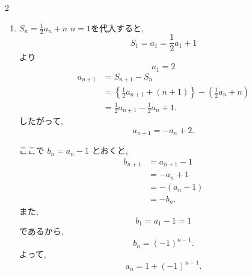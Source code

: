 \documentclass[dvipdfmx,a4paper,11pt,fleqn,openany]{jsbook}
\begin{document}
\begin{multicols*}{2}
\begin{enumerate}[label=(\arabic*),parsep=3pt]
          $n=1$を代入すると,
          \[
            S_1=a_1=2a_1-1
          \]
          より
          \[
            a_1=1
          \]
          また,
          \begin{align*}
            a_{n+1}
              &=S_{n+1}-S_n\\
              &=\{2a_{n+1}-(n+1)\}-(2a_n-n)\\
              &=2a_{n+1}-2a_n-1.
          \end{align*}
          したがって,
          \[
            a_{n+1}=2a_n+1.
          \]
          ここで $b_n=a_n+1$ とおくと,
          \begin{align*}
            b_{n+1}
              &=a_{n+1}+1\\
              &=2a_n+2\\
              &=2(a_n+1)\\
              &=2b_n.
          \end{align*}
          また,
          \[
            b_1=a_1+1=2
          \]
          であるから,
          \[
            b_n=2^n.
          \]
          よって,
          \[
            a_n=2^n-1.
          \]
      \item $\displaystyle S_n=\frac12a_n+n$
          $n=1$を代入すると,
          \[
            S_1=a_1=\frac12a_1+1
          \]
          より
          \[
            a_1=2
          \]
          \begin{align*}
            a_{n+1}
              &=S_{n+1}-S_n\\
              &=\left\{\frac12a_{n+1}+(n+1)\right\}-\left(\frac12a_n+n\right)\\
              &=\frac12a_{n+1}-\frac12a_n+1.
          \end{align*}
          したがって,
          \[
            a_{n+1}=-a_n+2.
          \]

          ここで $b_n=a_n-1$ とおくと,
          \begin{align*}
            b_{n+1}
              &=a_{n+1}-1\\
              &=-a_n+1\\
              &=-(a_n-1)\\
              &=-b_n.
          \end{align*}
          また,
          \[
            b_1=a_1-1=1
          \]
          であるから,
          \[
            b_n=(-1)^{n-1}.
          \]
          よって,
          \[
            a_n=1+(-1)^{n-1}.
          \]

      \end{enumerate}


\end{multicols*}
\end{document}
